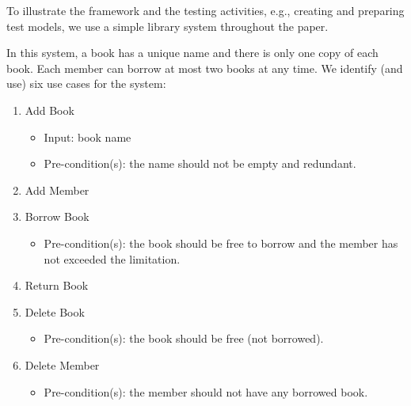%
%
\label{sec:running-example}
To illustrate the framework and the testing activities, e.g., creating and preparing test models, we use a simple library system throughout the paper. 

In this system, a book has a unique name and there is only one copy of each book. Each member can borrow at most two books at any time. We identify (and use) six use cases for the system:
\begin{enumerate}
	\item Add Book 
	\begin{itemize}
		\item  Input: book name
		\item Pre-condition(s): the name should not be empty and redundant.
	\end{itemize}

	\item Add Member
	
	\item Borrow Book
	\begin{itemize}
		\item Pre-condition(s): the book should be free to borrow and the member has not exceeded the limitation.
	\end{itemize}

	\item Return Book
	
	\item Delete Book
	\begin{itemize}
		\item Pre-condition(s): the book should be free (not borrowed).
	\end{itemize}

	\item Delete Member
	\begin{itemize}
		\item Pre-condition(s): the member should not have any borrowed book.
	\end{itemize}
\end{enumerate}
